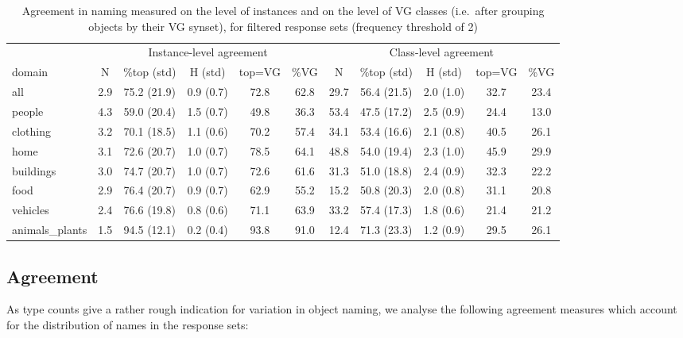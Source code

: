 \begin{table}
\begin{tabular}{lccccc|ccccc}
\toprule
 & \multicolumn{5}{c|}{Instance-level agreement} & \multicolumn{5}{c}{Class-level agreement}\\ 
          domain &    N &         \%top (std) &          H (std) & top=VG &   \%VG &     N &         \%top (std) &          H (std) & top=VG &   \%VG \\
\midrule
            all &  2.9 &  75.2 (21.9) &  0.9 (0.7) &   72.8 &  62.8 &  29.7 &  56.4 (21.5) &  2.0 (1.0) &   32.7 &  23.4 \\
            \midrule
                     people &  4.3 &  59.0 (20.4) &  1.5 (0.7) &   49.8 &  36.3 &  53.4 &  47.5 (17.2) &  2.5 (0.9) &   24.4 &  13.0 \\
       clothing &  3.2 &  70.1 (18.5) &  1.1 (0.6) &   70.2 &  57.4 &  34.1 &  53.4 (16.6) &  2.1 (0.8) &   40.5 &  26.1 \\
           home &  3.1 &  72.6 (20.7) &  1.0 (0.7) &   78.5 &  64.1 &  48.8 &  54.0 (19.4) &  2.3 (1.0) &   45.9 &  29.9 \\
                 buildings &  3.0 &  74.7 (20.7) &  1.0 (0.7) &   72.6 &  61.6 &  31.3 &  51.0 (18.8) &  2.4 (0.9) &   32.3 &  22.2 \\
           food &  2.9 &  76.4 (20.7) &  0.9 (0.7) &   62.9 &  55.2 &  15.2 &  50.8 (20.3) &  2.0 (0.8) &   31.1 &  20.8 \\
                  vehicles &  2.4 &  76.6 (19.8) &  0.8 (0.6) &   71.1 &  63.9 &  33.2 &  57.4 (17.3) &  1.8 (0.6) &   21.4 &  21.2 \\
 animals\_plants &  1.5 &  94.5 (12.1) &  0.2 (0.4) &   93.8 &  91.0 &  12.4 &  71.3 (23.3) &  1.2 (0.9) &   29.5 &  26.1 \\
\bottomrule
\end{tabular}

\caption{Agreement in naming measured on the level of instances and on the level of VG classes (i.e.\ after grouping objects by their VG synset), for filtered response sets (frequency threshold of 2)}
\label{tab:agree}
\end{table}



\subsection{Agreement}

As type counts give a rather rough indication for variation in object naming, we analyse the following agreement measures which account for the distribution of names in the response sets:

